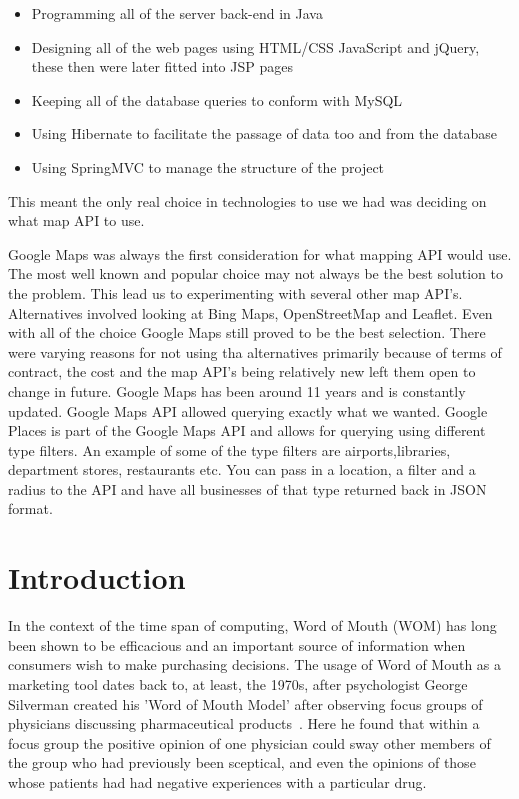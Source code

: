 \begin{itemize}
	\item{Programming all of the server back-end in Java}
	\item{Designing all of the web pages using HTML/CSS JavaScript and jQuery, these then were later fitted into JSP pages}
	\item{Keeping all of the database queries to conform with MySQL}
	\item{Using Hibernate to facilitate the passage of data too and from the database}
	\item{Using SpringMVC to manage the structure of the project}
\end{itemize}

This meant the only real choice in technologies to use we had was deciding on what map API to use.

Google Maps was always the first consideration for what mapping API would use. The most well known and popular choice may not always be the best solution to the problem. This lead us to experimenting with several other map API's. Alternatives involved looking at Bing Maps, OpenStreetMap and Leaflet. Even with all of the choice Google Maps still proved to be the best selection. There were varying reasons for not using tha alternatives primarily because of terms of contract, the cost and the map API's being relatively new left them open to change in future. Google Maps has been around 11 years and is constantly updated. Google Maps API allowed querying exactly what we wanted. Google Places is part of the Google Maps API and allows for querying using different type filters. An example of some of the type filters are airports,libraries, department stores, restaurants etc. You can pass in a location, a filter and a radius to the API and have all businesses of that type returned back in JSON format. \newline

\section{Introduction}
In the context of the time span of computing, Word of Mouth (WOM) has long been shown to be efficacious and an important source of information when consumers wish to make purchasing decisions\cite{Nielsen}. The usage of Word of Mouth as a marketing tool dates back to, at least, the 1970s, after psychologist George Silverman created his 'Word of Mouth Model' after observing focus groups of physicians discussing pharmaceutical products~\cite{WOM}. Here he found that within a focus group the positive opinion of one physician could sway other members of the group who had previously been sceptical, and even the opinions of those whose patients had had negative experiences with a particular drug.

